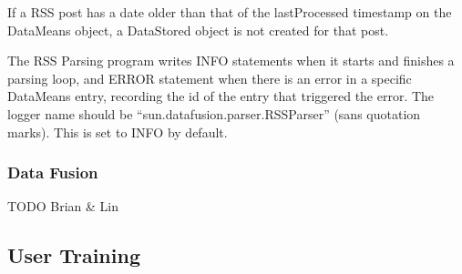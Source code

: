 \documentclass[11pt]{article} %
\begin{document}
If a RSS post has a date older than that of the lastProcessed timestamp on the DataMeans object, a DataStored object is not created for that post.

The RSS Parsing program writes INFO statements when it starts and finishes a parsing loop, and ERROR statement when there is an error in a specific DataMeans entry, recording the id of the entry that triggered the error. The logger name should be “sun.datafusion.parser.RSSParser” (sans quotation marks). This is set to INFO by default.

\subsubsection{Data Fusion}

TODO Brian \& Lin

\subsection{User Training}
\end{document}
